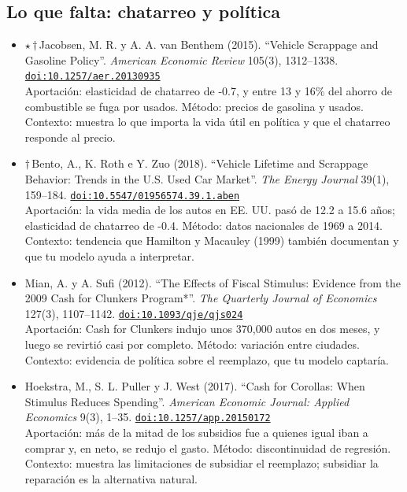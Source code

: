 \documentclass[11pt]{article}
\begin{document}
\subsection*{Lo que falta: chatarreo y política}
\begin{itemize}
\item $\star$\,$\dagger$\,Jacobsen, M. R. y A. A. van Benthem (2015). ``Vehicle Scrappage and Gasoline Policy''. \textit{American Economic Review} 105(3), 1312--1338. \href{https://doi.org/10.1257/aer.20130935}{\texttt{doi:10.1257/aer.20130935}}\\
Aportación: elasticidad de chatarreo de -0.7, y entre 13 y 16\% del ahorro de combustible se fuga por usados. Método: precios de gasolina y usados. Contexto: muestra lo que importa la vida útil en política y que el chatarreo responde al precio.
\item $\dagger$\,Bento, A., K. Roth e Y. Zuo (2018). ``Vehicle Lifetime and Scrappage Behavior: Trends in the U.S. Used Car Market''. \textit{The Energy Journal} 39(1), 159--184. \href{https://doi.org/10.5547/01956574.39.1.aben}{\texttt{doi:10.5547/01956574.39.1.aben}}\\
Aportación: la vida media de los autos en EE. UU. pasó de 12.2 a 15.6 años; elasticidad de chatarreo de -0.4. Método: datos nacionales de 1969 a 2014. Contexto: tendencia que Hamilton y Macauley (1999) también documentan y que tu modelo ayuda a interpretar.
\item Mian, A. y A. Sufi (2012). ``The Effects of Fiscal Stimulus: Evidence from the 2009 Cash for Clunkers Program*''. \textit{The Quarterly Journal of Economics} 127(3), 1107--1142. \href{https://doi.org/10.1093/qje/qjs024}{\texttt{doi:10.1093/qje/qjs024}}\\
Aportación: Cash for Clunkers indujo unos 370,000 autos en dos meses, y luego se revirtió casi por completo. Método: variación entre ciudades. Contexto: evidencia de política sobre el reemplazo, que tu modelo captaría.
\item Hoekstra, M., S. L. Puller y J. West (2017). ``Cash for Corollas: When Stimulus Reduces Spending''. \textit{American Economic Journal: Applied Economics} 9(3), 1--35. \href{https://doi.org/10.1257/app.20150172}{\texttt{doi:10.1257/app.20150172}}\\
Aportación: más de la mitad de los subsidios fue a quienes igual iban a comprar y, en neto, se redujo el gasto. Método: discontinuidad de regresión. Contexto: muestra las limitaciones de subsidiar el reemplazo; subsidiar la reparación es la alternativa natural.

\end{itemize}
\end{document}
